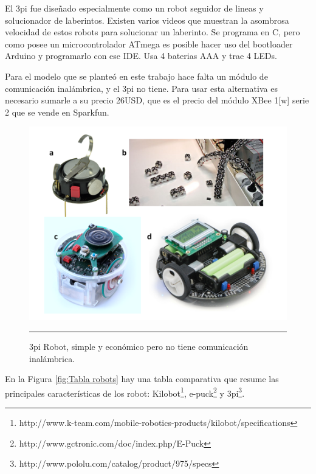El 3pi fue diseñado especialmente como un robot seguidor de lineas y solucionador de laberintos. Existen varios videos que muestran la asombrosa velocidad de estos robots para solucionar un laberinto. Se programa en C, pero como posee un microcontrolador ATmega es posible hacer uso del bootloader Arduino y programarlo con ese IDE. Usa 4 baterias AAA y trae 4 LEDs.

Para el modelo que se planteó en este trabajo hace falta un módulo de comunicación inalámbrica, y el 3pi no tiene. Para usar esta alternativa es necesario sumarle a su precio 26USD, que es el precio del módulo XBee 1[w] serie 2 que se vende en Sparkfun.

\begin{figure}[htbp]
	\centering
		\includegraphics[width=\textwidth]{./Figures/robots.png}
		\rule{35em}{0.5pt} 
	\caption[Robots estudiados como alternativa para armar un enjambre de robots.]{3pi Robot, simple y económico pero no tiene comunicación inalámbrica.}
	\label{fig:3pi}
\end{figure}

En la Figura \ref{fig:Tabla robots} hay una tabla comparativa que resume las principales características de los robot: Kilobot\footnote{http://www.k-team.com/mobile-robotics-products/kilobot/specifications}, e-puck\footnote{http://www.gctronic.com/doc/index.php/E-Puck} y 3pi\footnote{http://www.pololu.com/catalog/product/975/specs}.

